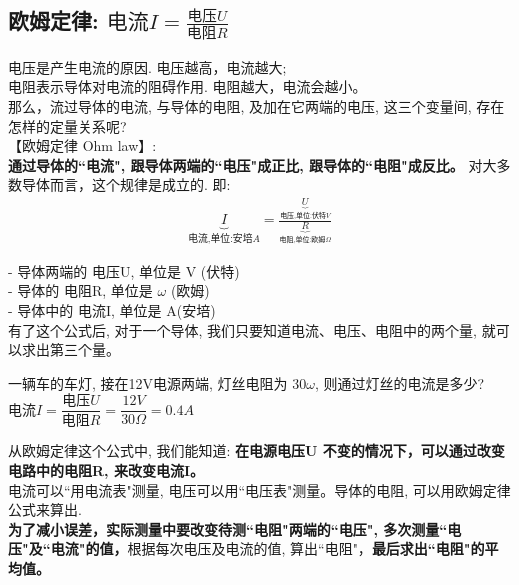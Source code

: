 \documentclass[UTF8]{ctexart}
\begin{document}
\vspace{1em} 
	
	
	\subsection{欧姆定律: $\text{电流}I=\frac{\text{电压}U}{\text{电阻}R}	$}
	
	电压是产生电流的原因. 电压越高，电流越大; \\
	电阻表示导体对电流的阻碍作用. 电阻越大，电流会越小。 \\
	那么，流过导体的电流, 与导体的电阻, 及加在它两端的电压, 这三个变量间, 存在怎样的定量关系呢? \\
	
	
	【欧姆定律  Ohm law】: \\
	\textbf{通过导体的``电流", 跟导体两端的``电压"成正比, 跟导体的``电阻"成反比。} 对大多数导体而言，这个规律是成立的. 即: 
	\begin{align}
		\boxed{
		\underset{\text{电流,单位:安培}A}{\underbrace{I}}=\frac{\underset{\text{电压,单位:伏特}V}{\underbrace{U}}}{\underset{\text{电阻,单位:欧姆}\varOmega}{\underbrace{R}}}			
		}
	\end{align} 
	
	- 导体两端的 电压U, 单位是 V (伏特) \\
	- 导体的 电阻R, 单位是 $\omega$ (欧姆) \\
	- 导体中的 电流I, 单位是 A(安培) \\
	
	有了这个公式后, 对于一个导体, 我们只要知道电流、电压、电阻中的两个量, 就可以求出第三个量。 \\	
	
	\begin{tcolorbox}[title = {例},boxrule={0.1em},colframe={black!10}, colback={black!3},colbacktitle={black!10},coltitle={black}]
 		一辆车的车灯, 接在12V电源两端, 灯丝电阻为 $30 \omega$, 则通过灯丝的电流是多少? \\
 		$\text{电流}I=\dfrac{\text{电压}U}{\text{电阻}R}=\dfrac{12V}{30\varOmega}=0.4A$ 			
	\end{tcolorbox}
	
	从欧姆定律这个公式中, 我们能知道: \textbf{在电源电压U 不变的情况下，可以通过改变电路中的电阻R, 来改变电流I。} \\
	
	
	电流可以``用电流表"测量, 电压可以用``电压表"测量。导体的电阻, 可以用欧姆定律公式来算出. \\	
	\textbf{为了减小误差，实际测量中要改变待测``电阻"两端的``电压", 多次测量``电压"及``电流"的值，}根据每次电压及电流的值, 算出``电阻"，\textbf{最后求出``电阻"的平均值。} \\
	
\end{document}
